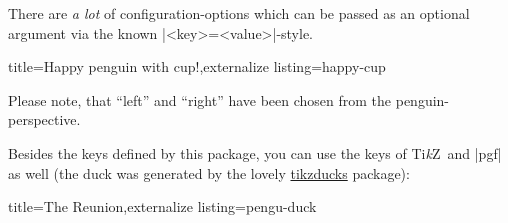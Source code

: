 \documentclass[parskip=half,english,numbers=noenddot,footnotes=nomultiple,oneside]{scrartcl}
\let\say\enquote
\def\TikZ{Ti\textit{k}Z}
\begin{document}
There are \textit{a lot} of configuration-options which can be passed as an optional argument via the known |<key>=<value>|-style.
\begin{tcblisting}{title={Happy penguin with cup!},externalize listing=happy-cup}
\end{tcblisting}
Please note, that \say{left} and \say{right} have been chosen from the penguin-perspective.

Besides the keys defined by this package, you can use the keys of \TikZ\ and |pgf| as well (the duck was generated by the lovely \href{https://github.com/samcarter/tikzducks}{tikzducks} package):
\begin{tcblisting}{title={The Reunion},externalize listing=pengu-duck}
\begin{tikzpicture}
	\duck
	\pingu[xshift=2.8cm, yshift=14mm,
	       eyes wink]
\end{tikzpicture}
\end{tcblisting}
\end{document}

